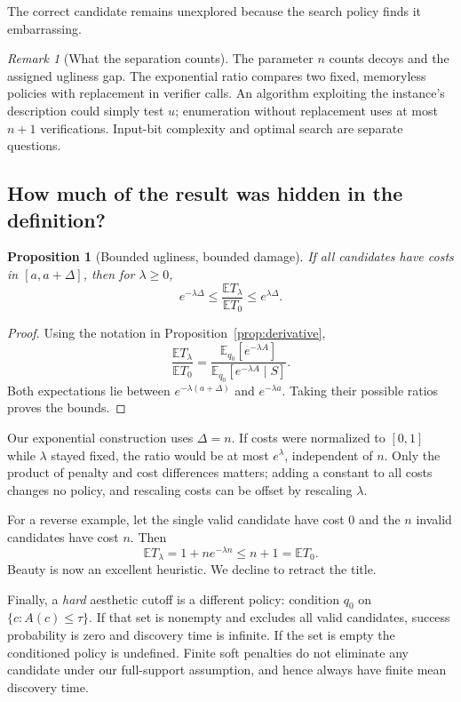 \documentclass[11pt]{article}
\newtheorem{proposition}[definition]{Proposition}
\theoremstyle{remark}
\newtheorem{remark}[definition]{Remark}
\newcommand{\E}{\mathbb{E}}
\begin{document}
The correct candidate remains unexplored because the search policy finds it
embarrassing.

\begin{remark}[What the separation counts]
The parameter $n$ counts decoys and the assigned ugliness gap. The
exponential ratio compares two fixed, memoryless policies with replacement
in verifier calls. An algorithm exploiting the instance's description
could simply test $u$; enumeration without replacement uses at most $n+1$
verifications. Input-bit complexity and optimal search are separate questions.
\end{remark}

\subsection{How much of the result was hidden in the definition?}

\begin{proposition}[Bounded ugliness, bounded damage]\label{prop:range}
If all candidates have costs in $[a,a+\Delta]$, then for $\lambda\geq0$,
\[
 e^{-\lambda\Delta}\leq
 \frac{\E T_\lambda}{\E T_0}
 \leq e^{\lambda\Delta}.
\]
\end{proposition}
\begin{proof}
Using the notation in Proposition~\ref{prop:derivative},
\[
 \frac{\E T_\lambda}{\E T_0}
 =\frac{\E_{q_0}[e^{-\lambda A}]}
        {\E_{q_0}[e^{-\lambda A}\mid S]}.
\]
Both expectations lie between $e^{-\lambda(a+\Delta)}$ and
$e^{-\lambda a}$. Taking their possible ratios proves the bounds.
\end{proof}

Our exponential construction uses $\Delta=n$. If costs were normalized to
$[0,1]$ while $\lambda$ stayed fixed, the ratio would be at most
$e^\lambda$, independent of $n$. Only the product of penalty and cost
differences matters; adding a constant to all costs changes no policy, and
rescaling costs can be offset by rescaling $\lambda$.

For a reverse example, let the single valid candidate have cost $0$ and the
$n$ invalid candidates have cost $n$. Then
\[
 \E T_\lambda=1+n e^{-\lambda n}\leq n+1=\E T_0.
\]
Beauty is now an excellent heuristic. We decline to retract the title.

Finally, a \emph{hard} aesthetic cutoff is a different policy: condition
$q_0$ on $\{c:A(c)\leq\tau\}$. If that set is nonempty and excludes all
valid candidates, success probability is zero and discovery time is
infinite. If the set is empty the conditioned policy is undefined.
Finite soft penalties do not eliminate any candidate under our full-support
assumption, and hence always have finite mean discovery time.
\end{document}

